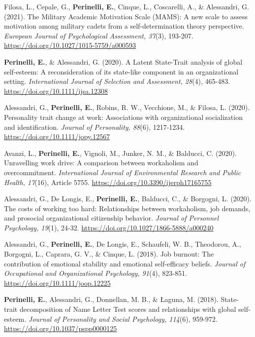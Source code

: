 \documentclass[hidelinks, letterpaper,10pt]{article} %
\begin{document}
\begin{etaremune}
\item Filosa, L., Cepale, G.,\textbf{ Perinelli, E.}, Cinque, L., Coscarelli, A., \& Alessandri, G. (2021). The Military Academic Motivation Scale (MAMS): A new scale to assess motivation among military cadets from a self-determination theory perspective.\textit{ European Journal of Psychological Assessment, 37}(3), 193-207. \url{https://doi.org/10.1027/1015-5759/a000593} 

\item \textbf{Perinelli, E.}, \& Alessandri, G. (2020). A Latent State-Trait analysis of global self-esteem: A reconsideration of its state-like component in an organizational setting. \textit{International Journal of Selection and Assessment, 28}(4), 465-483. \url{https://doi.org/10.1111/ijsa.12308}

\item Alessandri, G., \textbf{Perinelli, E.}, Robins, R. W., Vecchione, M., \& Filosa, L. (2020). Personality trait change at work: Associations with organizational socialization and identification. \textit{Journal of Personality, 88}(6), 1217-1234. \url{https://doi.org/10.1111/jopy.12567} 

\item Avanzi, L., \textbf{Perinelli, E.}, Vignoli, M., Junker, N. M., \& Balducci, C. (2020). Unravelling work drive: A comparison between workaholism and overcommitment.\textit{ International Journal of Environmental Research and Public Health, 17}(16), Article 5755. \url{https://doi.org/10.3390/ijerph17165755}

\item Alessandri, G., De Longis, E., \textbf{Perinelli, E.}, Balducci, C., \& Borgogni, L. (2020). The costs of working too hard: Relationships between workaholism, job demands, and prosocial organizational citizenship behavior. \textit{Journal of Personnel Psychology, 19}(1), 24-32. \url{https://doi.org/10.1027/1866-5888/a000240} 

\item Alessandri, G., \textbf{Perinelli, E.}, De Longis, E., Schaufeli, W. B., Theodorou, A., Borgogni, L., Caprara, G. V., \& Cinque, L. (2018). Job burnout: The contribution of emotional stability and emotional self-efficacy beliefs. \textit{Journal of Occupational and Organizational Psychology, 91}(4), 823-851. \url{https://doi.org/10.1111/joop.12225} 

\item \textbf{Perinelli, E.}, Alessandri, G., Donnellan, M. B., \& Łaguna, M. (2018). State-trait decomposition of Name Letter Test scores and relationships with global self-esteem. \textit{Journal of Personality and Social Psychology, 114}(6), 959-972. \url{https://doi.org/10.1037/pspp0000125} 


\end{etaremune}
\end{document}
